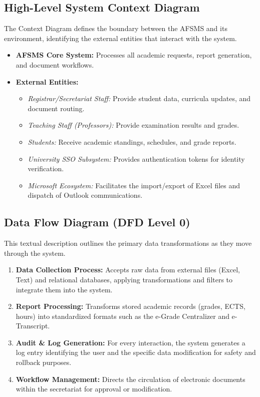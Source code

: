 \documentclass[11pt, a4paper]{article}
\begin{document}
\subsection{High-Level System Context Diagram}
The Context Diagram defines the boundary between the AFSMS and its environment, identifying the external entities that interact with the system.
\begin{itemize}
    \item \textbf{AFSMS Core System:} Processes all academic requests, report generation, and document workflows.
    \item \textbf{External Entities:}
    \begin{itemize}
        \item \textit{Registrar/Secretariat Staff:} Provide student data, curricula updates, and document routing.
        \item \textit{Teaching Staff (Professors):} Provide examination results and grades.
        \item \textit{Students:} Receive academic standings, schedules, and grade reports.
        \item \textit{University SSO Subsystem:} Provides authentication tokens for identity verification.
        \item \textit{Microsoft Ecosystem:} Facilitates the import/export of Excel files and dispatch of Outlook communications.
    \end{itemize}
\end{itemize}

\subsection{Data Flow Diagram (DFD Level 0)}
This textual description outlines the primary data transformations as they move through the system.
\begin{enumerate}
    \item \textbf{Data Collection Process:} Accepts raw data from external files (Excel, Text) and relational databases, applying transformations and filters to integrate them into the system.
    \item \textbf{Report Processing:} Transforms stored academic records (grades, ECTS, hours) into standardized formats such as the e-Grade Centralizer and e-Transcript.
    \item \textbf{Audit \& Log Generation:} For every interaction, the system generates a log entry identifying the user and the specific data modification for safety and rollback purposes.
    \item \textbf{Workflow Management:} Directs the circulation of electronic documents within the secretariat for approval or modification.
\end{enumerate}
\end{document}
